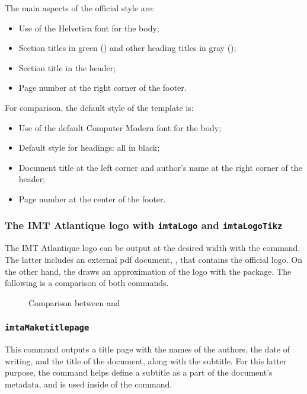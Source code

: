 \documentclass{report}
\begin{document}
The main aspects of the official style are:

\begin{itemize}
    \item Use of the Helvetica font for the body;
    \item Section titles in green () and other heading titles in gray ();
    \item Section title in the header;
    \item Page number at the right corner of the footer.
\end{itemize}

For comparison, the default style of the template is:

\begin{itemize}
    \item Use of the default Computer Modern font for the body;
    \item Default style for headings: all in black;
    \item Document title at the left corner and author's name at the right corner of the header;
    \item Page number at the center of the footer.
\end{itemize}

\subsubsection{The IMT Atlantique logo with \texttt{imtaLogo} and \texttt{imtaLogoTikz}}
The IMT Atlantique logo can be output at the desired width with the  command.
The latter includes an external pdf document, , that contains the official logo.
On the other hand, the  draws an approximation of the logo with the  package.
The following is a comparison of both commands.

\begin{figure}[H]
    \centering
    \imtaLogo{5cm}
    \imtaLogoTikz{5cm}
    \caption{Comparison between  and }
    \label{fig:imtaLogo}
\end{figure}


\subsubsection{\texttt{imtaMaketitlepage}}
This command outputs a title page with the names of the authors, the date of writing, and the title of the document, along with the subtitle.
For this latter purpose, the  command helps define a subtitle as a part of the document's metadata, and %
is used inside of the  command.
\end{document}
